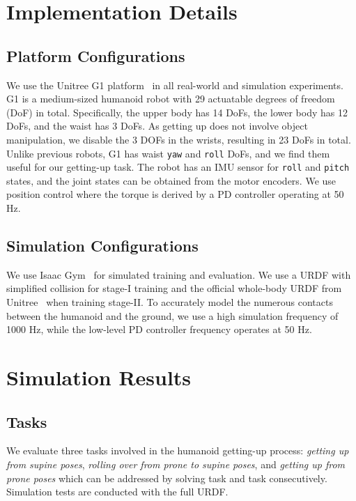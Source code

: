 \section{Implementation Details}\label{sec:exp_setup}

\subsection{Platform Configurations}
We use the Unitree G1 platform~\cite{UnitreeG124} in all real-world and simulation experiments. G1 is a medium-sized humanoid robot with 29 actuatable degrees of freedom (DoF) in total. Specifically, the upper body has 14 DoFs, the lower body has 12 DoFs, and the waist has 3 DoFs. As getting up does not involve object manipulation, we disable the 3 DOFs in the wrists, resulting in 23 DoFs in total.
Unlike previous robots, G1 has waist \texttt{yaw} and \texttt{roll} DoFs, and we find them useful for our getting-up task.
The robot has an IMU sensor for \texttt{roll} and \texttt{pitch} states, and the joint states can be obtained from the motor encoders. We use position control where the torque is derived by a PD controller operating at 50 Hz.

\subsection{Simulation Configurations}
We use Isaac Gym~\cite{IsaacGym21} for simulated training and evaluation.
We use a URDF with simplified collision for stage-I training and the official whole-body URDF from Unitree~\cite{UnitreeG124} when training stage-II.
To accurately model the numerous contacts between the humanoid and the ground, we use a high simulation frequency of 1000 Hz, while the low-level PD controller frequency operates at 50 Hz.

\section{Simulation Results}\label{sec:sim_exp}


\subsection{Tasks}
We evaluate three tasks involved in the humanoid getting-up process:
 \textit{getting up from supine poses},  \textit{rolling over from prone to supine poses}, and  \textit{getting up from prone poses} which can be addressed by solving task  and task  consecutively.  Simulation tests are conducted with the full URDF.



